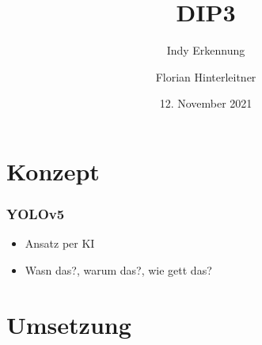 \documentclass[ignorenonframetext,naustrian,12pt,t]{beamer}
\author{Florian Hinterleitner}
\title{DIP3}
\subtitle{Indy Erkennung}
\date{12. November 2021}
\begin{document}
\begin{frame}
  \titlepage
\end{frame}


\section{Konzept}
	\begin{frame}
		\frametitle{YOLOv5}
		\begin{itemize}[label={\color{myTitleColour}\textbullet}]
		\item Ansatz per KI
		\item	Wasn das?, warum das?, wie gett das?
		\end{itemize}
	\end{frame}
	

\section{Umsetzung}
\end{document}
